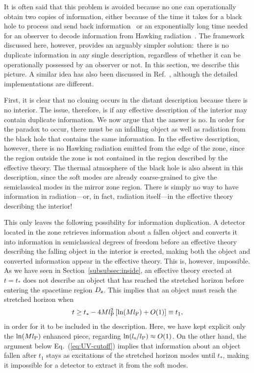 \documentclass[12pt]{article}
\begin{document}
It is often said that this problem is avoided because no one can 
operationally obtain two copies of information, either because 
of the time it takes for a black hole to process and send back 
information~\cite{Hayden:2007cs,Susskind:1993mu} or an exponentially 
long time needed for an observer to decode information from 
Hawking radiation~\cite{Harlow:2013tf}.  The framework discussed 
here, however, provides an arguably simpler solution:\ there is 
no duplicate information in any single description, regardless 
of whether it can be operationally possessed by an observer or 
not.  In this section, we describe this picture.  A similar idea 
has also been discussed in Ref.~\cite{Maldacena:2017axo}, although 
the detailed implementations are different.

First, it is clear that no cloning occurs in the distant description 
because there is no interior.  The issue, therefore, is if any 
effective description of the interior may contain duplicate 
information.  We now argue that the answer is no.  In order for 
the paradox to occur, there must be an infalling object as well 
as radiation from the black hole that contains the same information. 
In the effective description, however, there is no Hawking radiation 
emitted from the edge of the zone, since the region outside the 
zone is not contained in the region described by the effective 
theory.  The thermal atmosphere of the black hole is also absent 
in this description, since the soft modes are already coarse-grained 
to give the semiclassical modes in the mirror zone region.  There 
is simply no way to have information in radiation---or, in fact, 
radiation itself---in the effective theory describing the interior!

This only leaves the following possibility for information 
duplication.  A detector located in the zone retrieves information 
about a fallen object and converts it into information in 
semiclassical degrees of freedom before an effective theory 
describing the falling object in the interior is erected, making 
both the object and converted information appear in the effective 
theory.  This is, however, impossible.  As we have seen in 
Section~\ref{subsubsec:inside}, an effective theory erected 
at $t = t_*$ does not describe an object that has reached the 
stretched horizon before entering the spacetime region $D_{\rm z}$. 
This implies that an object must reach the stretched horizon when
%
\begin{equation}
  t \geq t_* - 4Ml_{\rm P}^2 \left[ \ln(Ml_{\rm P}) + O(1) \right] 
    \equiv t_1,
\label{eq:t_1}
\end{equation}
%
in order for it to be included in the description.  Here, we have 
kept explicit only the $\ln(Ml_{\rm P})$ enhanced piece, regarding 
$\ln(l_{\rm s}/l_{\rm P}) \approx O(1)$.  On the other hand, the 
argument below Eq.~(\ref{eq:UV-cutoff}) implies that information 
about an object fallen after $t_1$ stays as excitations of the 
stretched horizon modes until $t_*$, making it impossible for 
a detector to extract it from the soft modes.
\end{document}
